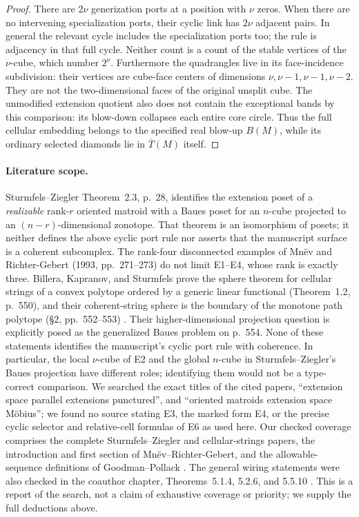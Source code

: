 \documentclass[11pt,a4paper]{article}
\begin{document}
\begin{proof}
There are $2\nu$ generization ports at a position with $\nu$ zeros. When
there are no intervening specialization ports, their cyclic link has
$2\nu$ adjacent pairs. In general the relevant cycle includes the
specialization ports too; the rule is adjacency in that full cycle. Neither
count is a count of the stable vertices of the $\nu$-cube, which number
$2^\nu$. Furthermore the quadrangles live in its face-incidence subdivision:
their vertices are cube-face centers of dimensions $\nu,\nu-1,\nu-1,\nu-2$.
They are not the two-dimensional faces of the original unsplit cube.
The unmodified extension quotient also does not contain the exceptional
bands by this comparison: its blow-down collapses each entire core
circle. Thus the full cellular embedding belongs to the specified real
blow-up $B(M)$, while its ordinary selected diamonds lie in
$\overline T(M)$ itself.
\end{proof}

\paragraph{Literature scope.}
Sturmfels--Ziegler Theorem~2.3, p.~28, identifies the extension poset of a
\emph{realizable} rank-$r$ oriented matroid with a Baues poset for an
$n$-cube projected to an $(n-r)$-dimensional zonotope. That theorem is an
isomorphism of posets; it neither defines the above cyclic port rule nor
asserts that the manuscript surface is a coherent subcomplex. The rank-four
disconnected examples of Mn\"ev and Richter-Gebert (1993, pp.~271--273)
\cite{MnevRichterGebert1993} do not limit E1--E4, whose rank is exactly three.
Billera, Kapranov, and Sturmfels prove the sphere theorem for cellular
strings of a convex polytope ordered by a generic linear functional
(Theorem~1.2, p.~550), and their coherent-string sphere is the boundary
of the monotone path polytope (\S2, pp.~552--553)
\cite{BilleraKapranovSturmfels1994}. Their higher-dimensional projection
question is explicitly posed as the generalized Baues problem on p.~554.
None of these statements identifies the manuscript's cyclic port rule
with coherence. In particular, the local $\nu$-cube of E2 and the global
$n$-cube in Sturmfels--Ziegler's Baues projection have different roles;
identifying them would not be a type-correct comparison.
We searched the exact titles of the cited papers, ``extension space parallel
extensions punctured'', and ``oriented matroids extension space M\"obius'';
we found no source stating E3, the marked form E4, or the precise cyclic
selector and relative-cell formulas of E6 as used here. Our checked
coverage comprises the complete Sturmfels--Ziegler and cellular-strings
papers, the introduction and first section of Mn\"ev--Richter-Gebert,
and the allowable-sequence definitions of Goodman--Pollack
\cite{GoodmanPollack1980}. The general wiring statements were also
checked in the coauthor chapter, Theorems~5.1.4, 5.2.6, and 5.5.10
\cite{FelsnerGoodman2017}. This is a
report of the search, not a claim of exhaustive coverage or priority;
we supply the full deductions above.
\end{document}
